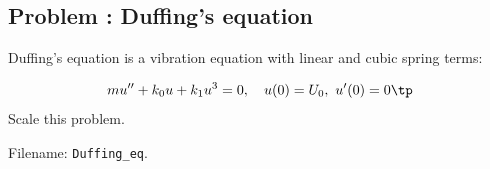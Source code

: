 \documentclass[graybox,envcountchap,sectrefs,final]{svmonodo}
\newcounter{doconce:movie:counter}
\newenvironment{doconceexercise}{}{}
\newcounter{doconceexercisecounter}
\begin{document}
\begin{doconceexercise}

\subsection*{Problem \thedoconceexercisecounter: Duffing's equation}

\label{scale:vib:exer:Duffing}

Duffing's equation is a vibration equation with linear and cubic
spring terms:

\[ mu'' + k_0u + k_1u^3 = 0,\quad u(0)=U_0,\ u'(0)=0\tp\]
Scale this problem.


\noindent Filename: \Verb!Duffing_eq!.

\end{doconceexercise}
\end{document}
